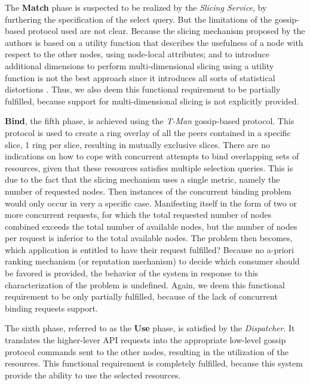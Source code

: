 \documentclass[12pt, titlepage]{uo_temp}
\begin{document}
     The \textbf{Match} phase is suspected to be realized by the \emph{Slicing Service},
     by furthering the specification of the select query. But the limitations of the
     gossip-based protocol used are not clear. Because the slicing mechanism proposed by
     the authors is based on a utility function that describes the usefulness of a node
     with respect to the other nodes, using node-local attributes; and to introduce
     additional dimensions to perform multi-dimensional slicing using a utility function
     is not the best approach since it introduces all sorts of statistical distortions
     \cite{pasquet2014autonomous}. Thus, we also deem this functional requirement to be
     partially fulfilled, because support for multi-dimensional slicing is not explicitly
     provided.

     \textbf{Bind}, the fifth phase, is achieved using the \emph{T-Man} gossip-based
     protocol. This protocol is used to create a ring overlay of all the peers contained
     in a specific slice, 1 ring per slice, resulting in mutually exclusive slices. There
     are no indications on how to cope with concurrent attempts to bind overlapping sets
     of resources, given that these resources satisfies multiple selection queries. This
     is due to the fact that the slicing mechanism uses a single
     metric, namely the number of requested nodes. Then instances of the concurrent binding
     problem would only occur in very a specific case. Manifesting itself in the
     form of two or more concurrent requests, for which the total requested number of nodes
     combined exceeds the total number of available nodes, but the number of nodes
     per request is inferior to the total available nodes. The problem then becomes,
     which application is entitled to have their request fulfilled? Because no a-priori
     ranking mechanism (or reputation mechanism) to decide which consumer should be
     favored is provided, the behavior of the system in response to this characterization of the
     problem is undefined. Again, we deem this functional requirement to be only partially
     fulfilled, because of the lack of concurrent binding requests support.

     The sixth phase, referred to as the \textbf{Use} phase, is satisfied by the
     \emph{Dispatcher}. It translates the higher-lever API requests into the appropriate
     low-level gossip protocol commands sent to the other nodes, resulting in the
     utilization of the resources. This functional requirement is completely fulfilled,
     because this system provide the ability to use the selected resources.
\end{document}
